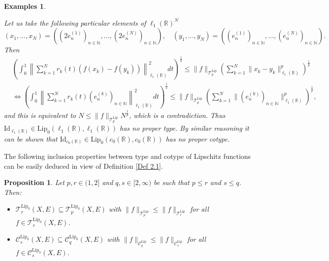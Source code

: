 \documentclass[12pt]{amsart}
\newtheorem{proposition}[theorem]{Proposition}
\newtheorem{example}[theorem]{Examples}
\def\C{\mathcal{C}}
\def\R{\mathbb{R}}
\def\T{\mathcal{T}}
\def\C{\mathcal{C}}
\def\N{\mathbb{N}}
\def\Lip{\mathrm{Lip}_0}
\def\Lipnorm{\mathrm{Lip}}
\begin{document}
\begin{example}
\begin{itemize}
		Let us take the following particular elements of $\ell_1(\R)^N$
		$$
		(x_1,\ldots, x_N) = ((2e_n^{(1)})_{n\in\N}, \ldots, (2e_n^{(N)})_{n\in\N}), \quad (y_1,\ldots, y_N) = ((e_n^{(1)})_{n\in\N}, \ldots, (e_n^{(N)})_{n\in\N}).
		$$ 
		Then
		\begin{align*}
			&\left( \int_{0}^{1}\left\| \sum_{k=1}^{N} r_k(t)(f(x_k)-f(y_k)) \right\|_{\ell_1(\R)}^2 dt \right)^{\frac{1}{2}} \leq \|f\|_{\T_p^{\Lipnorm}}\left( \sum_{k=1}^{N} \|x_k-y_k\|_{\ell_1(\R)}^p \right)^{\frac{1}{p}}\\
			&\Leftrightarrow \left(\int_{0}^{1} \left\| \sum_{k=1}^{N} r_k(t)(e_n^{(k)})_{n\in\N} \right\|_{\ell_1(\R)}^2 dt \right)^{\frac{1}{2}} \leq \|f\|_{\T_p^{\Lipnorm}}\left(\sum_{k=1}^{N} \|(e_n^{(k)})_{n\in\N}\|_{\ell_1(\R)}^p \right)^{\frac{1}{p}},
		\end{align*}
		and this is equivalent to $N \leq \|f\|_{\T_p^{\Lipnorm}}N^{\frac{1}{p}}$, which is a contradiction. Thus $\mathrm{Id}_{\ell_1(\R)} \in \Lip(\ell_1(\R),\ell_1(\R))$ has no proper type. By similar reasoning it can be shown that $\mathrm{Id}_{c_0(\R)} \in \Lip(c_0(\R),c_0(\R))$ has no proper cotype.
	\end{itemize}
\end{example}

The following inclusion properties between type and cotype of Lipschitz functions can be easily deduced in view of Definition \ref{Def 2.1}.

\begin{proposition}\label{Prop 2.4}
	Let $p,r\in (1,2]$ and $q,s \in [2,\infty)$ be such that $p \leq r$ and $s \leq q$. Then:
	\begin{itemize}
		\item[$(i)$] $\T_r^{\Lip}(X,E) \subseteq \T_p^{\Lip}(X,E)$ with $\|f\|_{\T_p^{\Lipnorm}} \leq \|f\|_{\T_r^{\Lipnorm}}$ for all $f \in \T_r^{\Lip}(X,E)$.
		\item[$(ii)$] $\C_s^{\Lip}(X,E) \subseteq \C_q^{\Lip}(X,E)$ with $\|f\|_{\C_q^{\Lipnorm}} \leq \|f\|_{\C_s^{\Lipnorm}}$ for all $f \in \C_s^{\Lip}(X,E)$. 
	\end{itemize}
\end{proposition}

\end{document}
